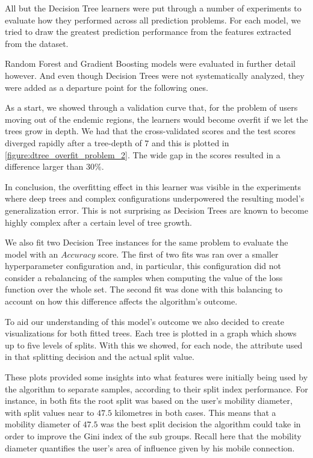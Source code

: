 All but the Decision Tree learners were put through a number of experiments to evaluate how they performed across all prediction problems.
For each model, we tried to draw the greatest prediction performance from the features extracted from the dataset.

Random Forest and Gradient Boosting models were evaluated in further detail however.
And even though Decision Trees were not systematically analyzed, they were added as a departure point for the following ones.

As a start, we showed through a validation curve that, for the problem of users moving out of the endemic regions, the learners would become overfit if we let the trees grow in depth.
We had that the cross-validated scores and the test scores diverged rapidly after a tree-depth of $7$ and this is plotted in \cref{figure:dtree_overfit_problem_2}.
The wide gap in the scores resulted in a difference larger than $30\%$.

In conclusion, the overfitting effect in this learner was visible in the experiments where deep trees and complex configurations underpowered the resulting model's generalization error.
This is not surprising as Decision Trees are known to become highly complex after a certain level of tree growth.


We also fit two Decision Tree instances for the same problem to evaluate the model with an $Accuracy$ score.
The first of two fits was ran over a smaller hyperparameter configuration and, in particular, this configuration did not consider a rebalancing of the samples when computing the value of the loss function over the whole set.
The second fit was done with this balancing to account on how this difference affects the algorithm's outcome.

To aid our understanding of this model's outcome we also decided to create visualizations for both fitted trees.
Each tree is plotted in a graph which shows up to five levels of splits.
With this we showed, for each node, the attribute used in that splitting decision and the actual split value.

These plots provided some insights into what features were initially being used by the algorithm to separate samples, according to their split index performance.
For instance, in both fits the root split was based on the user's mobility diameter, with split values near to $47.5$ kilometres in both cases.
This means that a mobility diameter of $47.5$ was the best split decision the algorithm could take in order to improve the Gini index of the sub groups.
Recall here that the mobility diameter quantifies the user's area of influence given by his mobile connection.

